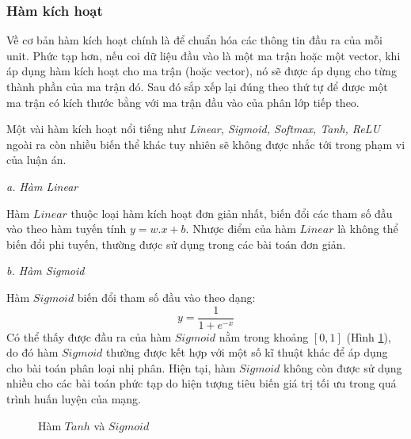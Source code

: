 \documentclass[12pt,a4paper]{report}
\begin{document}
\subsubsection{Hàm kích hoạt}
Về cơ bản hàm kích hoạt chính là để chuẩn hóa các thông tin đầu ra của mỗi unit. Phức tạp hơn, nếu coi dữ liệu đầu vào là một ma trận hoặc một vector, khi áp dụng hàm kích hoạt cho ma trận (hoặc vector), nó sẽ được áp dụng cho từng thành phần của ma trận đó. Sau đó sắp xếp lại đúng theo thứ tự để được một ma trận có kích thước bằng với ma trận đầu vào của phân lớp tiếp theo.

Một vài hàm kích hoạt nổi tiếng như \textit{Linear, Sigmoid, Softmax, Tanh, ReLU} ngoài ra còn nhiều biến thể khác tuy nhiên sẽ không được nhắc tới trong phạm vi của luận án.

\textit{a. Hàm Linear}

Hàm $Linear$ thuộc loại hàm kích hoạt đơn giản nhất, biến đổi các tham số đầu vào theo hàm tuyến tính $y = w.x + b$. Nhược điểm của hàm $Linear$ là không thể biến đổi phi tuyến, thường được sử dụng trong các bài toán đơn giản.

\textit{b. Hàm Sigmoid}

Hàm $Sigmoid$ biến đổi tham số đầu vào theo dạng:
	\begin{equation}
		y = \dfrac{1}{1 + e^{-x}}
	\end{equation}
Có thể thấy được đầu ra của hàm $Sigmoid$ nằm trong khoảng $[0, 1]$ (Hình \ref{fig:tanh-sigmoid-function}), do đó hàm $Sigmoid$ thường được kết hợp với một số kĩ thuật khác để áp dụng cho bài toán phân loại nhị phân. Hiện tại, hàm $Sigmoid$ không còn được sử dụng nhiều cho các bài toán phức tạp do hiện tượng tiêu biến giá trị tối ưu trong quá trình huấn luyện của mạng.

	\begin{figure}[h]
	    \centering
	    \caption{Hàm $Tanh$ và $Sigmoid$}
	    \label{fig:tanh-sigmoid-function}
	\end{figure}
\end{document}

